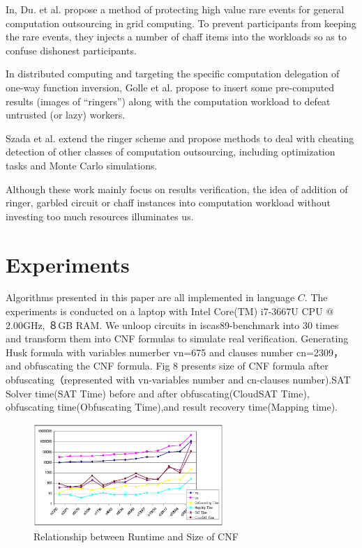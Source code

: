 \documentclass[runningheads,a4paper]{llncs}
\begin{document}
In\cite{t17}, Du. et al. propose a method of protecting high value rare events for general computation outsourcing in grid computing. To prevent participants from keeping the rare events, they injects a number of chaff items into the workloads so as to confuse dishonest participants.

In distributed computing and targeting the specific computation delegation of one-way function inversion, Golle et al. \cite{t31} propose to insert some pre-computed results (images of “ringers”) along with the computation workload to defeat untrusted (or lazy) workers. 

Szada et al. \cite{t33} extend the ringer scheme and propose methods to deal with cheating detection of other classes of computation outsourcing, including optimization tasks and Monte Carlo simulations.

Although these work mainly focus on results verification, the idea of addition of ringer, garbled circuit or chaff instances into computation workload without investing too much resources illuminates us.
\section{Experiments} 

Algorithms presented in this paper are all implemented in language $C$.
The experiments is conducted on a laptop with Intel Core(TM) i7-3667U CPU @ 2.00GHz, ８GB RAM. 
We unloop circuits in iscas89-benchmark into 30 times and transform them into CNF formulas to simulate real verification.
Generating Husk formula with variables numerber vn=675 and clauses number cn=2309，and obfuscating the CNF formula. 
Fig 8 presents size of CNF formula after obfuscating（represented with vn-variables number and cn-clauses number).SAT Solver time(SAT Time) before and after obfuscating(CloudSAT Time),
obfuscating time(Obfuscating Time),and result recovery time(Mapping time).


\begin{figure}
\centering
\includegraphics[width=7.2cm]{p1}
\caption{Relationship between Runtime and Size of CNF }
\end{figure}
\end{document}

